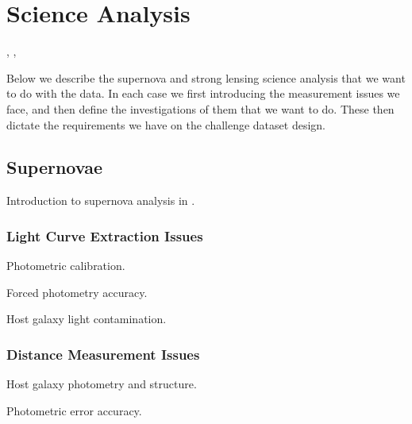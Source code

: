 \section{Science Analysis}
\def\secname{\chpname:science}
\label{\secname}

,
,

Below we describe the supernova and strong lensing science analysis
that we want to do with the \TwinklesOne data. In each case we first
introducing the measurement issues we face, and then define the
investigations of them that we want to do. These then dictate the
requirements we have on the challenge dataset design.


\subsection{Supernovae}
\label{\secname:supernovae}

Introduction to supernova analysis in \TwinklesOne.


\subsubsection{Light Curve Extraction Issues}
\label{\secname:supernovae:monitor}

Photometric calibration.

Forced photometry accuracy.

Host galaxy light contamination.



\subsubsection{Distance Measurement Issues}
\label{\secname:supernovae:distance}

Host galaxy photometry and structure.

Photometric error accuracy.


